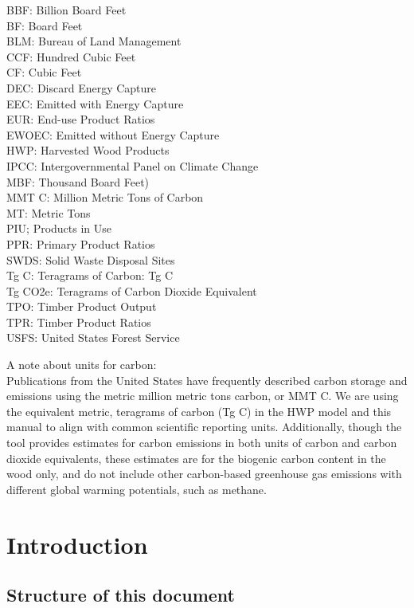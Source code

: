 \documentclass[
  openany]{book}
\begin{document}
BBF: Billion Board Feet\\
BF: Board Feet\\
BLM: Bureau of Land Management\\
CCF: Hundred Cubic Feet\\
CF: Cubic Feet\\
DEC: Discard Energy Capture\\
EEC: Emitted with Energy Capture\\
EUR: End-use Product Ratios\\
EWOEC: Emitted without Energy Capture\\
HWP: Harvested Wood Products\\
IPCC: Intergovernmental Panel on Climate Change\\
MBF: Thousand Board Feet)\\
MMT C: Million Metric Tons of Carbon\\
MT: Metric Tons\\
PIU; Products in Use\\
PPR: Primary Product Ratios\\
SWDS: Solid Waste Disposal Sites\\
Tg C: Teragrams of Carbon: Tg C\\
Tg CO2e: Teragrams of Carbon Dioxide Equivalent\\
TPO: Timber Product Output\\
TPR: Timber Product Ratios\\
USFS: United States Forest Service

A note about units for carbon:\\
Publications from the United States have frequently described carbon
storage and emissions using the metric million metric tons carbon, or
MMT C. We are using the equivalent metric, teragrams of carbon (Tg C) in
the HWP model and this manual to align with common scientific reporting
units. Additionally, though the tool provides estimates for carbon
emissions in both units of carbon and carbon dioxide equivalents, these
estimates are for the biogenic carbon content in the wood only, and do
not include other carbon-based greenhouse gas emissions with different
global warming potentials, such as methane.

\hypertarget{int}{%
\chapter{Introduction}\label{int}}

\hypertarget{int-struc}{%
\section{Structure of this document}\label{int-struc}}
\end{document}
